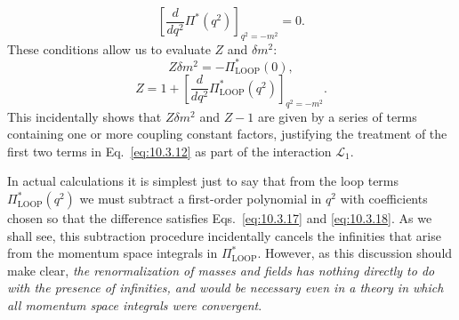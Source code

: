 \begin{equation}
\left[\frac{d}{dq^2}\Pi^*(q^2)\right]_{q^2=-m^2}=0.
\tag{10.3.18}\label{eq:10.3.18}
\end{equation}
These conditions allow us to evaluate $Z$ and $\delta m^2$:
\begin{equation}
Z\delta m^2=-\Pi^*_{\mathrm{LOOP}}(0),
\tag{10.3.19}\label{eq:10.3.19}
\end{equation}
\begin{equation}
Z=1+\left[\frac{d}{dq^2}\Pi^*_{\mathrm{LOOP}}(q^2)\right]_{q^2=-m^2}.
\tag{10.3.20}\label{eq:10.3.20}
\end{equation}
This incidentally shows that $Z\delta m^2$ and $Z-1$ are given by a series of
terms containing one or more coupling constant factors, justifying the
treatment of the first two terms in Eq.~\eqref{eq:10.3.12} as part of the
interaction $\mathcal L_1$.

In actual calculations it is simplest just to say that from the loop terms
$\Pi^*_{\mathrm{LOOP}}(q^2)$ we must subtract a first-order polynomial in
$q^2$ with coefficients chosen so that the difference satisfies
Eqs.~\eqref{eq:10.3.17} and \eqref{eq:10.3.18}. As we shall see, this
subtraction procedure incidentally cancels the infinities that arise from the
momentum space integrals in $\Pi^*_{\mathrm{LOOP}}$. However, as this
discussion should make clear, \emph{the renormalization of masses and fields
has nothing directly to do with the presence of infinities, and would be
necessary even in a theory in which all momentum space integrals were
convergent}.

